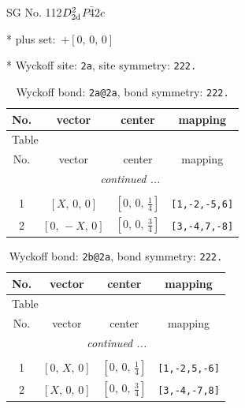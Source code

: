 \documentclass[fleqn,8pt]{jsarticle}
\begin{document}
\setcounter{MaxMatrixCols}{32}

\renewcommand{\tablename}{Table~}
\renewcommand{\figurename}{Figure~}
\begin{center}
\LARGE
SG No. 112\quad$D_{\rm 2d}^{2}$\quad$P\bar{4}2c$\quad[ tetragonal ]
\end{center}

* plus set:\,\,\,$+\left[ 0,\, 0,\, 0 \right]$


* Wyckoff site: {\tt 2a}, site symmetry: {\tt 222.}
\renewcommand{\arraystretch}{1.2}
\begin{longtable}{cccc}
\caption{Wyckoff bond: {\tt 2a@2a}, bond symmetry: {\tt 222.}}
 \\
 \hline \hline
No. & vector & center & mapping \\ \hline \endfirsthead

\multicolumn{3}{l}{\tablename\ \thetable{}} \\
 \hline \hline
No. & vector & center & mapping \\ \hline \endhead

 \hline \hline
\multicolumn{3}{r}{\footnotesize\it continued ...} \\ \endfoot

 \hline \hline
\multicolumn{3}{r}{} \\ \endlastfoot

1 & $\left[ X,\, 0,\, 0 \right]$ & $\left[ 0,\, 0,\, \frac{1}{4} \right]$ & {\tt [1,-2,-5,6]} \\ \hline
2 & $\left[ 0,\, - X,\, 0 \right]$ & $\left[ 0,\, 0,\, \frac{3}{4} \right]$ & {\tt [3,-4,7,-8]} \\
\end{longtable}
\renewcommand{\arraystretch}{1.2}
\begin{longtable}{cccc}
\caption{Wyckoff bond: {\tt 2b@2a}, bond symmetry: {\tt 222.}}
 \\
 \hline \hline
No. & vector & center & mapping \\ \hline \endfirsthead

\multicolumn{3}{l}{\tablename\ \thetable{}} \\
 \hline \hline
No. & vector & center & mapping \\ \hline \endhead

 \hline \hline
\multicolumn{3}{r}{\footnotesize\it continued ...} \\ \endfoot

 \hline \hline
\multicolumn{3}{r}{} \\ \endlastfoot

1 & $\left[ 0,\, X,\, 0 \right]$ & $\left[ 0,\, 0,\, \frac{1}{4} \right]$ & {\tt [1,-2,5,-6]} \\ \hline
2 & $\left[ X,\, 0,\, 0 \right]$ & $\left[ 0,\, 0,\, \frac{3}{4} \right]$ & {\tt [3,-4,-7,8]} \\
\end{longtable}
\end{document}
